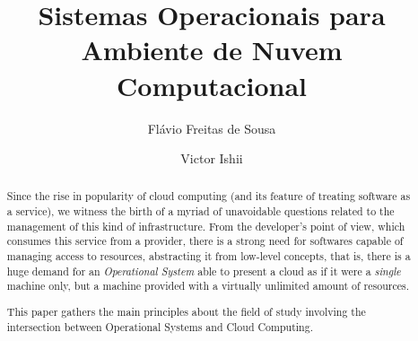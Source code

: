 \documentclass{llncs}
\begin{document}
\title{Sistemas Operacionais para Ambiente de Nuvem Computacional}
%
%
%
%

\author[1]{Flávio Freitas de Sousa}
\author[2]{Victor Ishii}

%

\maketitle              %


\begin{abstract}
Since the rise in popularity of cloud computing (and its feature of treating software as a service), we witness the birth of a myriad of unavoidable questions related to the management of this kind of infrastructure. From the developer's point of view, which consumes this service from a provider, there is a strong need for softwares capable of managing access to resources, abstracting it from low-level concepts, that is, there is a huge demand for an \emph{Operational System} able to present a cloud as if it were a \emph{single} machine only, but a machine provided with a virtually unlimited amount of resources.

This paper gathers the main principles about the field of study involving the intersection between Operational Systems and Cloud Computing.
\end{abstract}
\end{document}
